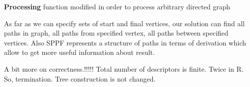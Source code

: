 \begin{algorithm}[h]
\begin{algorithmic}[1]
\caption{\textbf{Processing} function modified in order to process arbitrary directed graph}
\label{modifAlgo}
       \Else 
       \EndIf
       \EndIf
	   \EndFor
  \EndCase
       \EndFor
  \EndCase
  \EndCase
  \Case{$\_$}
  \EndCase
  \EndSwitch
\EndFunction

\end{algorithmic}
\end{algorithm}

As far as we can specify sets of start and final vertices, our solution can find all paths in graph, all paths from specified vertex, all paths between specified vertices. 
Also SPPF represents a structure of paths in terms of derivation which allow to get more useful information about result. 

A bit more on correctness.!!!!! Total number of descriptors is finite. Twice in R. So, termination. Tree construction is not changed. 